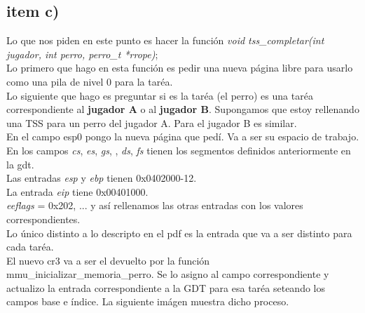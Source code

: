 \subsection{item c)}
Lo que nos piden en este punto es hacer la función \textit{void tss_completar(int jugador, int perro, perro_t *rrope)};\\
Lo primero que  hago en esta función es pedir una nueva página libre para usarlo como una pila de nivel 0 para la taréa.\\
Lo siguiente que hago es preguntar si es la taréa (el perro) es una taréa correspondiente al \textbf{jugador A} o al \textbf{jugador B}. Supongamos que estoy rellenando una TSS para un perro del jugador A. Para el jugador B es similar.\\
En el campo esp0 pongo la nueva página que pedí. Va a ser su espacio de trabajo.\\
En los campos \textit{cs}, \textit{es}, \textit{gs}, , \textit{ds}, \textit{fs} tienen los segmentos definidos anteriormente en la gdt.\\
Las entradas \textit{esp} y \textit{ebp} tienen 0x0402000-12.\\
La entrada \textit{eip} tiene 0x00401000.\\
\textit{eeflags} = 0x202, ... y así rellenamos las otras entradas con los valores correspondientes.\\
Lo único distinto a lo descripto en el pdf es la entrada  que va a ser distinto para cada taréa.\\
El nuevo cr3 va a ser el devuelto por la función mmu_inicializar_memoria_perro. Se lo asigno al campo correspondiente y actualizo la entrada correspondiente a la GDT para esa taréa seteando los campos base e índice.
La siguiente imágen muestra dicho proceso.\	\









